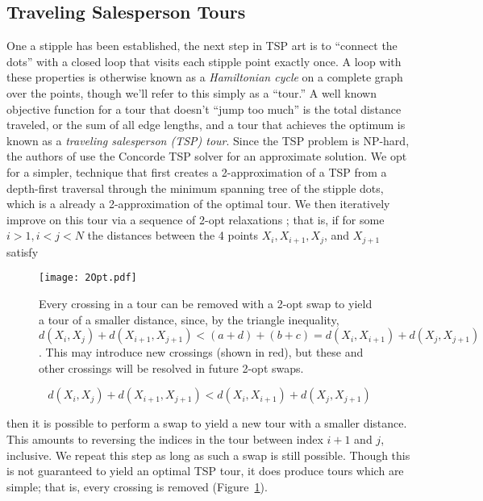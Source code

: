 \documentclass[runningheads]{llncs}
\begin{document}
\subsection{Traveling Salesperson Tours}
\label{sec:tsp}
One a stipple has been established, the next step in TSP art is to ``connect the dots'' with a closed loop that visits each stipple point exactly once.  A loop with these properties is otherwise known as a {\em Hamiltonian cycle} on a complete graph over the points, though we'll refer to this simply as a ``tour.''  A well known objective function for a tour that doesn't ``jump too much'' is the total distance traveled, or the sum of all edge lengths, and a tour that achieves the optimum is known as a {\em traveling salesperson (TSP) tour}.  Since the TSP problem is NP-hard, the authors of  \cite{kaplan2005tsp} use the Concorde TSP solver \cite{applegate2001concorde} for an approximate solution. We opt for a simpler, technique that first creates a 2-approximation of a TSP from a depth-first traversal through the minimum spanning tree of the stipple dots, which is a already a 2-approximation of the optimal tour.  We then iteratively improve on this tour via a sequence of 2-opt relaxations \cite{johnson1997traveling}; that is, if for some $i > 1, i < j < N$ the distances between the 4 points $X_i, X_{i+1}, X_j$, and $X_{j+1}$ satisfy

\begin{figure}
  \centering
  \texttt{[image: 2Opt.pdf]}
  \caption{Every crossing in a tour can be removed with a 2-opt swap to yield a tour of a smaller distance, since, by the triangle inequality, $d(X_i, X_j) + d(X_{i+1}, X_{j+1}) < (a+d) + (b+c) = d(X_i, X_{i+1}) + d(X_j, X_{j+1})$.  This may introduce new crossings (shown in red), but these and other crossings will be resolved in future 2-opt swaps.}
  \label{fig:TwoOpt}
\end{figure}

\begin{equation}
  d(X_i, X_j) + d(X_{i+1}, X_{j+1}) < d(X_i, X_{i+1}) + d(X_j, X_{j+1})
\end{equation}

then it is possible to perform a swap to yield a new tour with a smaller distance.  This amounts to reversing the indices in the tour between index $i+1$ and $j$, inclusive.  We repeat this step as long as such a swap is still possible.  Though this is not guaranteed to yield an optimal TSP tour, it does produce tours which are simple; that is, every crossing is removed (Figure~\ref{fig:TwoOpt}).
\end{document}
